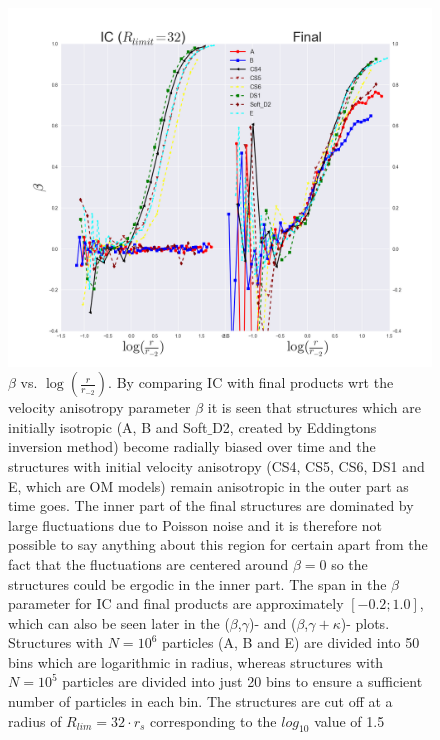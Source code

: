 \begin{figure}[!htbp]
\centering
\includegraphics[width=1.0\linewidth]{img/Fig_logr_r2_beta_ABCS4CS5CS6DS1D2E_IC_Final_R_limit_32.png}
\caption{$\beta$ vs. $\log (\frac{r}{r_{-2}})$. By comparing IC with final products wrt the velocity anisotropy parameter $\beta$ it is seen that structures which are initially isotropic (A, B and Soft$\_$D2, created by Eddingtons inversion method) become radially biased over time and the structures with initial velocity anisotropy (CS4, CS5, CS6, DS1 and E, which are OM models) remain anisotropic in the outer part as time goes. The inner part of the final structures are dominated by large fluctuations due to Poisson noise and it is therefore not possible to say anything about this region for certain apart from the fact that the fluctuations are centered around $\beta = 0$ so the structures could be ergodic in the inner part. The span in the $\beta$ parameter for IC and final products are approximately $[-0.2;1.0]$, which can also be seen later in the ($\beta$,$\gamma$)- and ($\beta$,$\gamma + \kappa$)- plots. Structures with $N = 10^6$ particles (A, B and E) are divided into 50 bins which are logarithmic in radius, whereas structures with $N = 10^5$ particles are divided into just 20 bins to ensure a sufficient number of particles in each bin. The structures are cut off at a radius of $R_{lim} = 32\cdot r_s$ corresponding to the $log_{10}$ value of 1.5}
\label{fig:test}
\end{figure}

